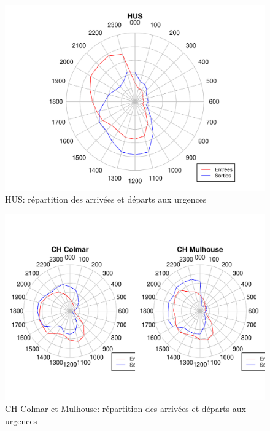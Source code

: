\documentclass[12pt,english,french,twoside]{report}\usepackage[]{graphicx}\usepackage[]{color}
\makeatletter
\def\maxwidth{ %
  \ifdim\Gin@nat@width>\linewidth
    \linewidth
  \else
    \Gin@nat@width
  \fi
}
\newenvironment{knitrout}{}{} %
\makeatother
\begin{document}
\begin{figure}
\begin{center}
\begin{knitrout}
\color{fgcolor}
\includegraphics[width=\maxwidth]{figure/test2} 

\end{knitrout}

\end{center}
\caption{HUS: répartition des arrivées et départs aux urgences}
\label{passage:hus}
\end{figure}

\begin{figure}
\begin{center}
\begin{knitrout}
\color{fgcolor}
\includegraphics[width=\maxwidth]{figure/test22} 

\end{knitrout}

\end{center}
\caption{CH Colmar et Mulhouse: répartition des arrivées et départs aux urgences}
\label{passage:col}
\end{figure}
\end{document}
